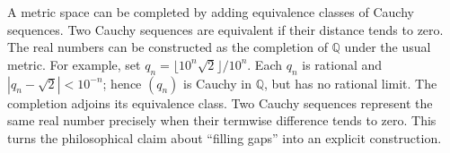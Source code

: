 A metric space can be completed by adding equivalence classes of Cauchy sequences.  Two Cauchy sequences are equivalent if their distance tends to zero.  The real numbers can be constructed as the completion of \(\mathbb Q\) under the usual metric. For example, set \(q_n=\lfloor10^n\sqrt2\rfloor/10^n\). Each \(q_n\) is rational and \(|q_n-\sqrt2|<10^{-n}\); hence \((q_n)\) is Cauchy in \(\mathbb Q\), but has no rational limit. The completion adjoins its equivalence class. Two Cauchy sequences represent the same real number precisely when their termwise difference tends to zero. This turns the philosophical claim about ``filling gaps'' into an explicit construction.
